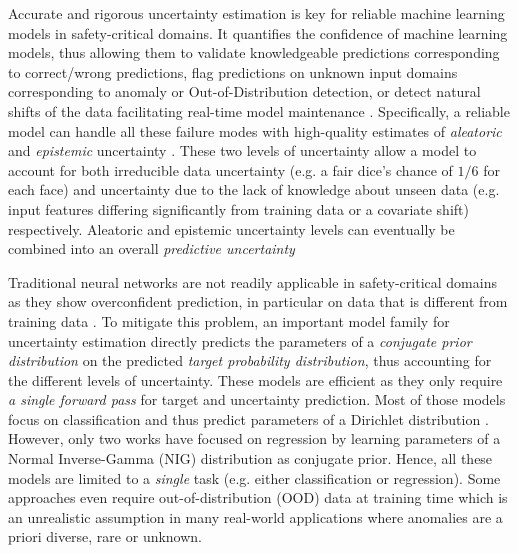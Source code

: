 Accurate and rigorous uncertainty estimation is key for reliable machine learning models in safety-critical domains. It quantifies the confidence of machine learning models, thus allowing them to validate knowledgeable predictions corresponding to correct/wrong predictions, flag predictions on unknown input domains corresponding to anomaly or Out-of-Distribution detection, or detect natural shifts of the data facilitating real-time model maintenance \citep{dataset-shift, shifts-dataset, comparison-bayesian-diabetic}. Specifically, a reliable model can handle all these failure modes with high-quality estimates of \emph{aleatoric} and \emph{epistemic} uncertainty \citep{uncertainty-deep-learning}. These two levels of uncertainty allow a model to account for both irreducible data uncertainty (e.g. a fair dice's chance of $1/6$ for each face) and uncertainty due to the lack of knowledge about unseen data (e.g. input features differing significantly from training data or a covariate shift) respectively. Aleatoric and epistemic uncertainty levels can eventually be combined into an overall \emph{predictive uncertainty} \citep{uncertainty-deep-learning}

Traditional neural networks are not readily applicable in safety-critical domains as they show overconfident prediction, in particular on data that is different from training data \citep{calibration-network, ensembles}. To mitigate this problem, an important model family for uncertainty estimation directly predicts the parameters of a \emph{conjugate prior distribution} on the predicted \emph{target probability distribution}, thus accounting for the different levels of uncertainty. These models are efficient as they only require \emph{a single forward pass} for target and uncertainty prediction. Most of those models focus on classification and thus predict parameters of a Dirichlet distribution \citep{uceloss,charpentier2020,PriorNetworks,reverse-kl,max_gap_id_ood,uncertainty-generative-classifier,multifaceted_uncertainty,graph-postnet,graph_uncertainty, lightweight-prob-net}. However, only two works \citep{evidential-regression, regression-priornet} have focused on regression by learning parameters of a Normal Inverse-Gamma (NIG) distribution as conjugate prior. Hence, all these models are limited to a \emph{single} task (e.g. either classification or regression). Some approaches even require out-of-distribution (OOD) data at training time \citep{PriorNetworks, reverse-kl} which is an unrealistic assumption in many real-world applications where anomalies are a priori diverse, rare or unknown.

